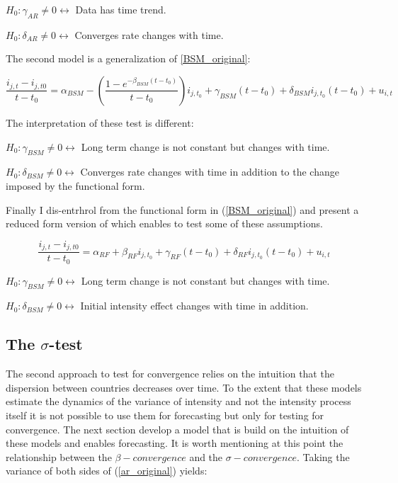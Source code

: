 \documentclass[]{amsart}
\begin{document}
$H_0: \gamma_{AR} \neq 0 \leftrightarrow $   Data has time trend.

$H_0: \delta_{AR} \neq 0 \leftrightarrow $  Converges rate changes with time.

\bigskip

The second model is a generalization of \ref{BSM_original}:

\bigskip

\begin{equation}
\frac{i_{j,t}-i_{j,t0}}{t-t_0}  = \alpha_{BSM} - \left( \frac{1- e^{-\beta_{BSM}(t-t_0)}}{t-t_0} \right) i_{j,t_0}+ \gamma_{BSM}(t-t_0)+ \delta_{BSM}i_{j,t_0}(t-t_0)+u_{i, t}
\label{BSM_full}
\end{equation}

\bigskip

The interpretation of these test is different:

$H_0: \gamma_{BSM} \neq 0 \leftrightarrow $   Long term change is not constant but changes with time.

$H_0: \delta_{BSM} \neq 0 \leftrightarrow $  Converges rate changes with time in addition to the change imposed by the functional form.

\bigskip

Finally I dis-entrhrol from the functional form in (\ref{BSM_original}) and present a reduced form version of \cite{barro1992convergence} which enables to test some of these assumptions.

\bigskip

\begin{equation}
\frac{i_{j,t}-i_{j,t0}}{t-t_0}  = \alpha_{RF} +\beta_{RF} i_{j,t_0}+\gamma_{RF} (t-t_0) +\delta_{RF} i_{j,t_0}(t-t_0)+u_{i, t}
\label{RF_full}
\end{equation}

$H_0: \gamma_{BSM} \neq 0 \leftrightarrow $   Long term change is not constant but changes with time.

$H_0: \delta_{BSM} \neq 0 \leftrightarrow $  Initial intensity effect changes with time in addition.

\bigskip

\subsection{The $\sigma$-test}

The second approach to test for convergence relies on the intuition that the dispersion between countries decreases over time. To the extent that these models estimate the dynamics of the variance of intensity and not the intensity process itself it is not possible to use them for forecasting but only for testing for convergence. The next section develop a model that is build on the intuition of these models and enables forecasting. It is worth mentioning at this point the relationship between the $\beta-convergence$ and the $\sigma-convergence$. Taking the variance of both sides of (\ref{ar_original}) yields:
\end{document}
